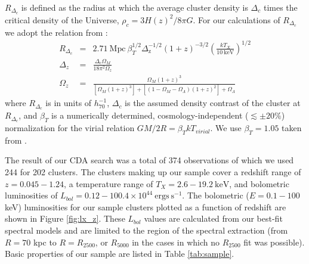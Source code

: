 $R_{\Delta_c}$ is defined as the radius at which the average cluster
density is $\Delta_c$ times the critical density of the Universe,
$\rho_c=3H(z)^2/8\pi G$. For our calculations of $R_{\Delta_c}$ we
adopt the relation from \citet{2002A&A...389....1A}:
\begin{eqnarray}
R_{\Delta_c} &=& 2.71 \mathrm{~Mpc~}
\beta_T^{1/2}
\Delta_{\mathrm{z}}^{-1/2}
(1+z)^{-3/2}
\left(\frac{kT_X}{10 \mathrm{~keV}}\right)^{1/2}\\
\Delta_z &=& \frac{\Delta_c \Omega_M}{18\pi^2\Omega_z} \nonumber \\
\Omega_z &=& \frac{\Omega_M (1+z)^3}{[\Omega_M
(1+z)^3]+[(1-\Omega_M-\Omega_{\Lambda})(1+z)^2]+\Omega_{\Lambda}} \nonumber
\end{eqnarray}
where $R_{\Delta_c}$ is in units of $h_{70}^{-1}$, $\Delta_c$ is the
assumed density contrast of the cluster at $R_{\Delta_c}$, and
$\beta_T$ is a numerically determined, cosmology-independent
($\lesssim \pm 20\%$) normalization for the virial relation $GM/2R =
\beta_T kT_{virial}$. We use $\beta_T = 1.05$ taken from
\citet{1996ApJ...469..494E}.

The result of our CDA search was a total of 374 observations of which
we used 244 for 202 clusters. The clusters making up our sample cover
a redshift range of $z = 0.045-1.24$, a temperature range of $T_X =
2.6-19.2 \mathrm{~keV}$, and bolometric luminosities of $L_{bol} =
0.12-100.4\times10^{44} \mathrm{~ergs~s}^{-1}$. The bolometric ($E =
0.1-100$ keV) luminosities for our sample clusters plotted as a
function of redshift are shown in Figure \ref{fig:lx_z}. These
$L_{bol}$ values are calculated from our best-fit spectral models and
are limited to the region of the spectral extraction (from $R=70$ kpc
to $R=R_{2500}$, or $R_{5000}$ in the cases in which no $R_{2500}$ fit
was possible). Basic properties of our sample are listed in Table
\ref{tab:sample}.

